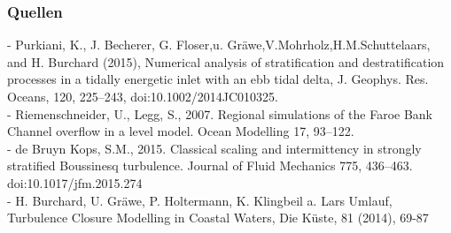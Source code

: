 \documentclass[11pt,t]{beamer}
\begin{document}
\begin{frame}
\frametitle{Quellen}
\footnotesize
- Purkiani, K., J. Becherer, G. Floser,u. Gräwe,V.Mohrholz,H.M.Schuttelaars,
and H. Burchard (2015), Numerical analysis of stratification and destratification processes in a tidally energetic inlet with an ebb tidal delta, J. Geophys. Res. Oceans,
120, 225–243, doi:10.1002/2014JC010325.\\
- Riemenschneider, U., Legg, S., 2007. Regional simulations of the Faroe Bank Channel overflow in a level model. Ocean Modelling 17, 93–122.\\
- de Bruyn Kops, S.M., 2015. Classical scaling and intermittency in strongly stratified Boussinesq turbulence. Journal of Fluid Mechanics 775, 436–463. doi:10.1017/jfm.2015.274\\
- H. Burchard, U. Gräwe, P. Holtermann, K. Klingbeil a. Lars Umlauf, Turbulence Closure Modelling in Coastal Waters, Die Küste, 81 (2014), 69-87\\
\end{frame}




\end{document}
